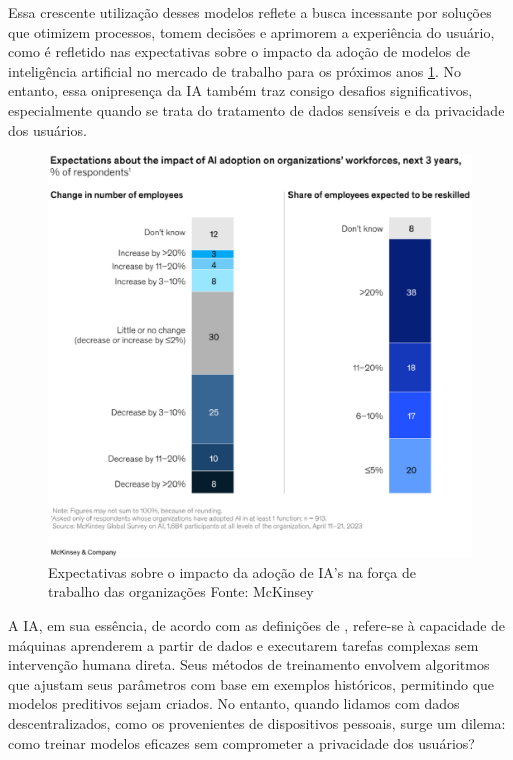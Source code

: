 Essa crescente utilização desses modelos reflete a busca incessante por soluções que otimizem processos, tomem decisões e aprimorem a experiência do usuário, como é refletido nas expectativas sobre o impacto da adoção de modelos de inteligência artificial no mercado de trabalho para os próximos anos \ref{fig:capacidadeIA}. No entanto, essa onipresença da IA também traz consigo desafios significativos, especialmente quando se trata do tratamento de dados sensíveis e da privacidade dos usuários.

\begin{figure}[h]
    \centering
    \includegraphics[scale = 0.8]{figuras/ExpectationsAboutImpact.eps}
    \caption{Expectativas sobre o impacto da adoção de IA's na força de trabalho das organizações Fonte: McKinsey
    \cite{mckinsey2023}}
    \label{fig:capacidadeIA}
\end{figure}

A IA, em sua essência, de acordo com as definições de \cite{russel}, refere-se à capacidade de máquinas aprenderem a partir de dados e executarem tarefas complexas sem intervenção humana direta. Seus métodos de treinamento envolvem algoritmos que ajustam seus parâmetros com base em exemplos históricos, permitindo que modelos preditivos sejam criados. No entanto, quando lidamos com dados descentralizados, como os provenientes de dispositivos pessoais, surge um dilema: como treinar modelos eficazes sem comprometer a privacidade dos usuários?


